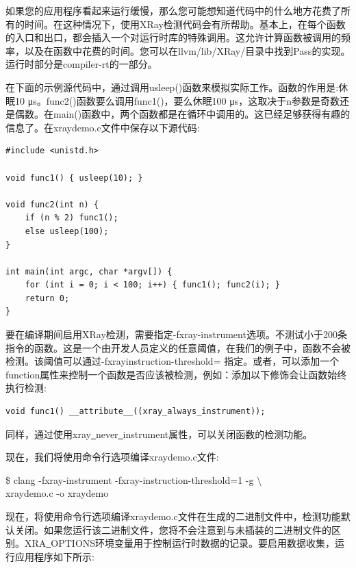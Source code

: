 
如果您的应用程序看起来运行缓慢，那么您可能想知道代码中的什么地方花费了所有的时间。在这种情况下，使用XRay检测代码会有所帮助。基本上，在每个函数的入口和出口，都会插入一个对运行时库的特殊调用。这允许计算函数被调用的频率，以及在函数中花费的时间。您可以在llvm/lib/XRay/目录中找到Pass的实现。运行时部分是compiler-rt的一部分。\par

在下面的示例源代码中，通过调用usleep()函数来模拟实际工作。函数的作用是:休眠10 μs。func2()函数要么调用func1()，要么休眠100 μs，这取决于n参数是奇数还是偶数。在main()函数中，两个函数都是在循环中调用的。这已经足够获得有趣的信息了。在xraydemo.c文件中保存以下源代码:\par

\begin{lstlisting}[caption={}]
#include <unistd.h>

void func1() { usleep(10); }

void func2(int n) {
	if (n % 2) func1();
	else usleep(100);
}

int main(int argc, char *argv[]) {
	for (int i = 0; i < 100; i++) { func1(); func2(i); }
	return 0;
}
\end{lstlisting}

要在编译期间启用XRay检测，需要指定-fxray-instrument选项。不测试小于200条指令的函数。这是一个由开发人员定义的任意阈值，在我们的例子中，函数不会被检测。该阈值可以通过-fxrayinstruction-threshold= 指定。或者，可以添加一个function属性来控制一个函数是否应该被检测，例如：添加以下修饰会让函数始终执行检测:\par

\begin{lstlisting}[caption={}]
void func1() __attribute__((xray_always_instrument));
\end{lstlisting}

同样，通过使用xray\underline{~}never\underline{~}instrument属性，可以关闭函数的检测功能。\par

现在，我们将使用命令行选项编译xraydemo.c文件:

\begin{tcolorbox}[colback=white,colframe=black]
\$ clang -fxray-instrument -fxray-instruction-threshold=1 -g $\setminus$ \\
\hspace*{1cm}xraydemo.c -o xraydemo
\end{tcolorbox}

现在，将使用命令行选项编译xraydemo.c文件在生成的二进制文件中，检测功能默认关闭。如果您运行该二进制文件，您将不会注意到与未插装的二进制文件的区别。XRA\underline{~}OPTIONS环境变量用于控制运行时数据的记录。要启用数据收集，运行应用程序如下所示:\par

